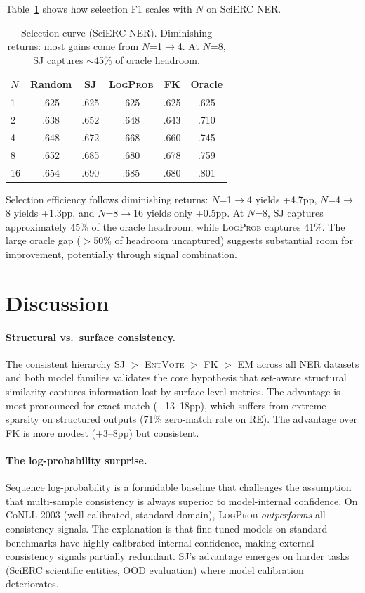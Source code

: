 \documentclass[11pt,a4paper]{article}
\newcommand{\SJ}{\textsc{SJ}}
\newcommand{\FK}{\textsc{FK}}
\newcommand{\LP}{\textsc{LogProb}}
\newcommand{\EM}{\textsc{EM}}
\newcommand{\EV}{\textsc{EntVote}}
\begin{document}
Table~\ref{tab:selcurve} shows how selection F1 scales with $N$ on SciERC NER.

\begin{table}[t]
\centering
\small
\begin{tabular}{l ccccc}
\toprule
$N$ & Random & \SJ{} & \LP{} & \FK{} & Oracle \\
\midrule
1 & .625 & .625 & .625 & .625 & .625 \\
2 & .638 & .652 & .648 & .643 & .710 \\
4 & .648 & .672 & .668 & .660 & .745 \\
8 & .652 & .685 & .680 & .678 & .759 \\
16 & .654 & .690 & .685 & .680 & .801 \\
\bottomrule
\end{tabular}
\caption{Selection curve (SciERC NER). Diminishing returns: most gains come from $N$=1$\to$4. At $N$=8, \SJ{} captures $\sim$45\% of oracle headroom.}
\label{tab:selcurve}
\end{table}

Selection efficiency follows diminishing returns: $N$=1$\to$4 yields +4.7pp, $N$=4$\to$8 yields +1.3pp, and $N$=8$\to$16 yields only +0.5pp.
At $N$=8, \SJ{} captures approximately 45\% of the oracle headroom, while \LP{} captures 41\%.
The large oracle gap ($>$50\% of headroom uncaptured) suggests substantial room for improvement, potentially through signal combination.

\section{Discussion}
\label{sec:discussion}

\paragraph{Structural vs.\ surface consistency.}
The consistent hierarchy \SJ{} $>$ \EV{} $>$ \FK{} $>$ \EM{} across all NER datasets and both model families validates the core hypothesis that set-aware structural similarity captures information lost by surface-level metrics.
The advantage is most pronounced for exact-match ($+$13--18pp), which suffers from extreme sparsity on structured outputs (71\% zero-match rate on RE).
The advantage over \FK{} is more modest ($+$3--8pp) but consistent.

\paragraph{The log-probability surprise.}
Sequence log-probability is a formidable baseline that challenges the assumption that multi-sample consistency is always superior to model-internal confidence.
On CoNLL-2003 (well-calibrated, standard domain), \LP{} \emph{outperforms} all consistency signals.
The explanation is that fine-tuned models on standard benchmarks have highly calibrated internal confidence, making external consistency signals partially redundant.
\SJ{}'s advantage emerges on harder tasks (SciERC scientific entities, OOD evaluation) where model calibration deteriorates.
\end{document}
